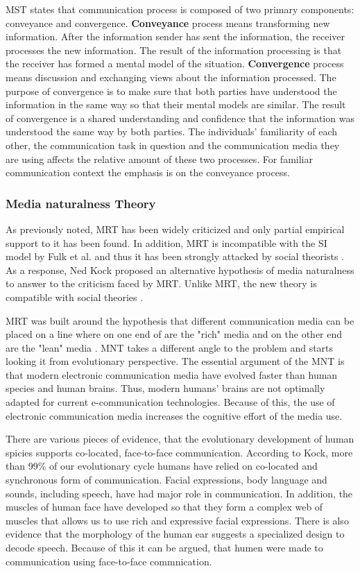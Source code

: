 \documentclass[english,12pt,a4paper,pdftex]{article}
\begin{document}
\ac{MST} states that communication process is composed of two primary components: conveyance and convergence. \textbf{Conveyance} process means transforming new information. After the information sender has sent the information, the receiver processes the new information. The result of the information processing is that the receiver has formed a mental model of the situation. \textbf{Convergence} process means discussion and exchanging views about the information processed. The purpose of convergence is to make sure that both parties have understood the information in the same way so that their mental models are similar. The result of convergence is a shared understanding and confidence that the information was understood the same way by both parties. The individuals' familiarity of each other, the communication task in question and the communication media they are using affects the relative amount of these two processes. For familiar communication context the emphasis is on the conveyance process. \citep{dennis2008}

\subsubsection{Media naturalness Theory}

As previously noted, \ac{MRT} has been widely criticized and only partial empirical support to it has been found. In addition, \ac{MRT} is incompatible with the \ac{SI} model by Fulk et al. \citep{fulk1987} \citep{schmitz1991} and thus it has been strongly attacked by social theorists \citep{kock2005}. As a response, Ned Kock proposed an alternative hypothesis of media naturalness to answer to the criticism faced by \ac{MRT}. Unlike \ac{MRT}, the new theory is compatible with social theories \citep{kock2005}.

\ac{MRT} was built around the hypothesis that different communication media can be placed on a line where on one end of are the "rich" media and on the other end are the "lean" media \citep{daft1986}. \Ac{MNT} takes a different angle to the problem and starts looking it from evolutionary perspective. The essential argument of the \ac{MNT} is that modern electronic communication media have evolved faster than human species and human brains. Thus, modern humans' brains are not optimally adapted for current e-communication technologies. Because of this, the use of electronic communication media increases the cognitive effort of the media use. \citep{kock2005}

There are various pieces of evidence, that the evolutionary development of human spicies supports co-located, face-to-face communication. According to Kock, more than 99\% of our evolutionary cycle humans have relied on co-located and synchronous form of communication. Facial expressions, body language and sounds, including speech, have had major role in communication. In addition, the muscles of human face have developed so that they form a complex web of muscles that allows us to use rich and expressive facial expressions. There is also evidence that the morphology of the human ear suggests a specialized design to decode speech. Because of this it can be argued, that humen were made to communication using face-to-face commnication. \citep{kock2005}
\end{document}
